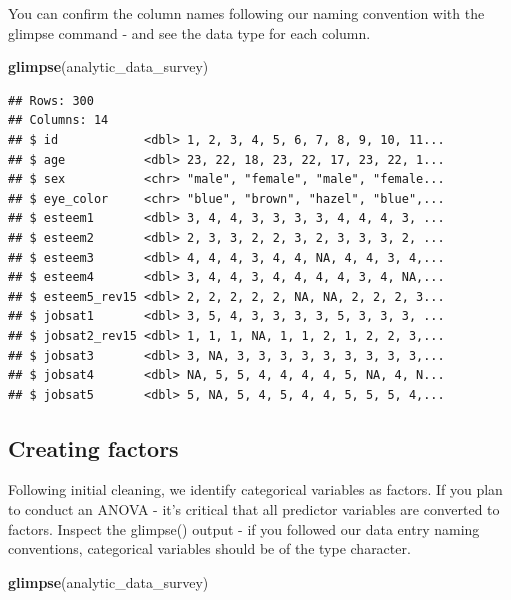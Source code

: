 \documentclass[
]{krantz}
\makeatletter
\newenvironment{Shaded}{\begin{snugshade}}{\end{snugshade}}
\newcommand{\KeywordTok}[1]{\textcolor[rgb]{0.27,0.27,0.27}{\textbf{#1}}}
\newcommand{\NormalTok}[1]{#1}
\newenvironment{kframe}{%
\medskip{}
\setlength{\fboxsep}{.8em}
 \def\at@end@of@kframe{}%
 \ifinner\ifhmode%
  \def\at@end@of@kframe{\end{minipage}}%
  \begin{minipage}{\columnwidth}%
 \fi\fi%
 \def\FrameCommand##1{\hskip\@totalleftmargin \hskip-\fboxsep
 \colorbox{shadecolor}{##1}\hskip-\fboxsep
     \hskip-\linewidth \hskip-\@totalleftmargin \hskip\columnwidth}%
 \MakeFramed {\advance\hsize-\width
   \@totalleftmargin\z@ \linewidth\hsize
   \@setminipage}}%
 {\par\unskip\endMakeFramed%
 \at@end@of@kframe}
\renewenvironment{Shaded}{\begin{kframe}}{\end{kframe}}
\makeatother
\begin{document}
You can confirm the column names following our naming convention with the glimpse command - and see the data type for each column.

\begin{Shaded}
\begin{Highlighting}[]
\KeywordTok{glimpse}\NormalTok{(analytic_data_survey)}
\end{Highlighting}
\end{Shaded}

\begin{verbatim}
## Rows: 300
## Columns: 14
## $ id            <dbl> 1, 2, 3, 4, 5, 6, 7, 8, 9, 10, 11...
## $ age           <dbl> 23, 22, 18, 23, 22, 17, 23, 22, 1...
## $ sex           <chr> "male", "female", "male", "female...
## $ eye_color     <chr> "blue", "brown", "hazel", "blue",...
## $ esteem1       <dbl> 3, 4, 4, 3, 3, 3, 3, 4, 4, 4, 3, ...
## $ esteem2       <dbl> 2, 3, 3, 2, 2, 3, 2, 3, 3, 3, 2, ...
## $ esteem3       <dbl> 4, 4, 4, 3, 4, 4, NA, 4, 4, 3, 4,...
## $ esteem4       <dbl> 3, 4, 4, 3, 4, 4, 4, 4, 3, 4, NA,...
## $ esteem5_rev15 <dbl> 2, 2, 2, 2, 2, NA, NA, 2, 2, 2, 3...
## $ jobsat1       <dbl> 3, 5, 4, 3, 3, 3, 3, 5, 3, 3, 3, ...
## $ jobsat2_rev15 <dbl> 1, 1, 1, NA, 1, 1, 2, 1, 2, 2, 3,...
## $ jobsat3       <dbl> 3, NA, 3, 3, 3, 3, 3, 3, 3, 3, 3,...
## $ jobsat4       <dbl> NA, 5, 5, 4, 4, 4, 4, 5, NA, 4, N...
## $ jobsat5       <dbl> 5, NA, 5, 4, 5, 4, 4, 5, 5, 5, 4,...
\end{verbatim}

\hypertarget{creating-factors-3}{%
\subsection{Creating factors}\label{creating-factors-3}}

Following initial cleaning, we identify categorical variables as factors. If you plan to conduct an ANOVA - it's critical that all predictor variables are converted to factors. Inspect the glimpse() output - if you followed our data entry naming conventions, categorical variables should be of the type character.

\begin{Shaded}
\begin{Highlighting}[]
\KeywordTok{glimpse}\NormalTok{(analytic_data_survey)}
\end{Highlighting}
\end{Shaded}
\end{document}
